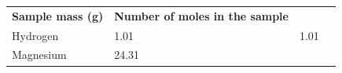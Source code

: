 \begin{enumerate}[noitemsep, label=\textbf{\arabic*}. ]
{\begin{center}
\begin{xtabular*}{\mytablewidth}[t]{|p{10\mystarwidth}|p{10\mystarwidth}|p{10\mystarwidth}|p{10\mystarwidth}|}
    
        \textbf{Sample mass (g)} &
    
    
        \textbf{Number of moles in the sample}%
     \tabularnewline{}
    
    
        Hydrogen &
    
    
        1.01 &
    
    
        1.01 &
    
    
     \tabularnewline{}
    
    
        Magnesium &
    
    
        24.31 &
    

\end{xtabular*}
\end{center}}
\end{enumerate}
